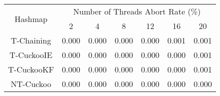 \begin{tabular}{|c|c|c|c|c|c|c|}
\hline
\multirow{2}{*}{Hashmap} & \multicolumn{6}{c|}{Number of Threads Abort Rate (\%)}\\\cline{2-7}& 2 & 4 & 8 & 12 & 16 & 20\\
\hline
\hline
T-Chaining & 0.000 & 0.000 & 0.000 & 0.000 & 0.001 & 0.001\\
T-CuckooIE & 0.000 & 0.000 & 0.000 & 0.000 & 0.000 & 0.001\\
T-CuckooKF & 0.000 & 0.000 & 0.000 & 0.000 & 0.000 & 0.001\\
NT-Cuckoo & 0.000 & 0.000 & 0.000 & 0.000 & 0.000 & 0.000\\
\hline
\end{tabular}
